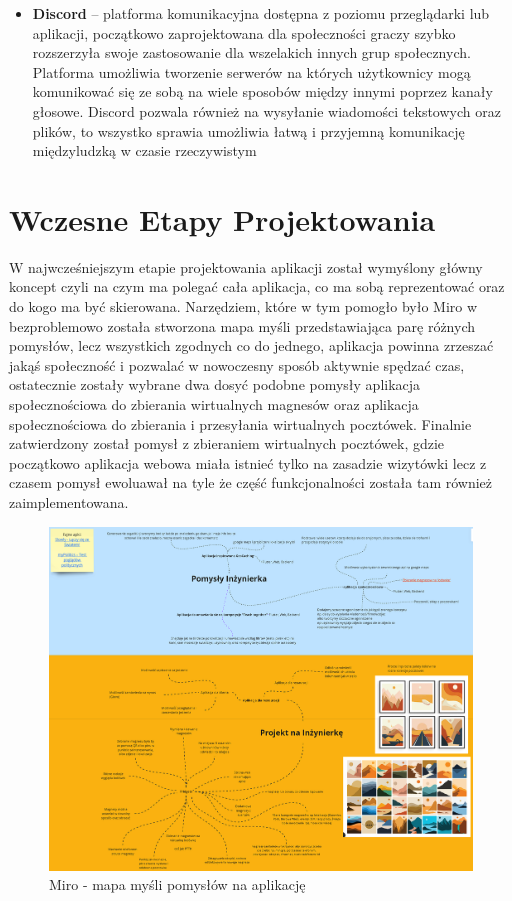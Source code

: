 \documentclass[a4paper,twoside,12pt]{book}
\begin{document}
\begin{itemize}
    \item \textbf{Discord} -- platforma komunikacyjna dostępna z poziomu przeglądarki lub aplikacji, początkowo zaprojektowana dla społeczności graczy szybko rozszerzyła swoje zastosowanie dla wszelakich innych grup społecznych. Platforma umożliwia tworzenie serwerów na których użytkownicy mogą komunikować się ze sobą na wiele sposobów między innymi poprzez kanały głosowe. Discord pozwala również na wysyłanie wiadomości tekstowych oraz plików, to wszystko sprawia umożliwia łatwą i przyjemną komunikację międzyludzką w czasie rzeczywistym
\end{itemize}
\newpage

\section{Wczesne Etapy Projektowania}

W najwcześniejszym etapie projektowania aplikacji został wymyślony główny koncept czyli na czym ma polegać cała aplikacja, co ma sobą reprezentować oraz do kogo ma być skierowana. Narzędziem, które w tym pomogło było Miro w bezproblemowo została stworzona mapa myśli przedstawiająca parę różnych pomysłów, lecz wszystkich zgodnych co do jednego, aplikacja powinna zrzeszać jakąś społeczność i pozwalać w nowoczesny sposób aktywnie spędzać czas, ostatecznie zostały wybrane dwa dosyć podobne pomysły
aplikacja społecznościowa do zbierania wirtualnych magnesów oraz aplikacja społecznościowa do zbierania i przesyłania wirtualnych pocztówek. Finalnie zatwierdzony został pomysł z zbieraniem wirtualnych pocztówek, gdzie początkowo aplikacja webowa miała istnieć tylko na zasadzie wizytówki lecz z czasem pomysł ewoluawał na tyle że część funkcjonalności została tam również zaimplementowana.
\begin{figure}[H]
    \centering
    \includegraphics[width=1\textwidth]{wizje_ss/miro.png}
    \caption{Miro - mapa myśli pomysłów na aplikację}
\end{figure}
\newpage
\end{document}
